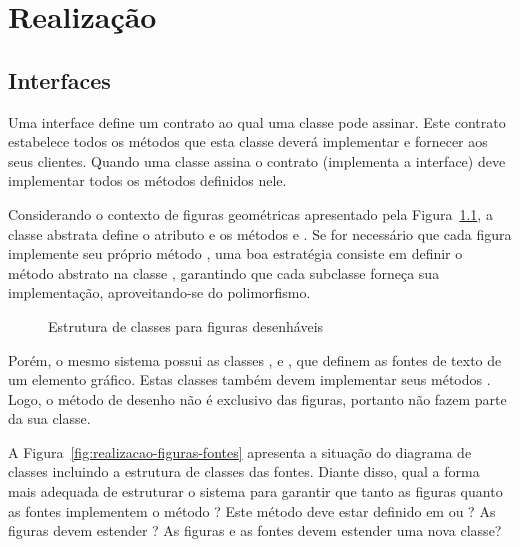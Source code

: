 \chapter{Realização}

\section{Interfaces}

Uma interface define um contrato ao qual uma classe pode assinar. Este contrato estabelece todos os métodos que esta classe deverá implementar e fornecer aos seus clientes. Quando uma classe assina o contrato (implementa a interface) deve implementar todos os métodos definidos nele.

Considerando o contexto de figuras geométricas apresentado pela Figura~\ref{fig:realizacao-figuras}, a classe abstrata  define o atributo  e os métodos  e . Se for necessário que cada figura implemente seu próprio método , uma boa estratégia consiste em definir o método abstrato  na classe , garantindo que cada subclasse forneça sua implementação, aproveitando-se do polimorfismo.

\begin{figure}[h]
	\centering
	
	
	\caption{Estrutura de classes para figuras desenháveis}
	\label{fig:realizacao-figuras}
\end{figure}

Porém, o mesmo sistema possui as classes ,  e , que definem as fontes de texto de um elemento gráfico. Estas classes também devem implementar seus métodos . Logo, o método de desenho não é exclusivo das figuras, portanto não fazem parte da sua classe.

A Figura~\ref{fig:realizacao-figuras-fontes} apresenta a situação do diagrama de classes incluindo a estrutura de classes das fontes. Diante disso, qual a forma mais adequada de estruturar o sistema para garantir que tanto as figuras quanto as fontes implementem o método ? Este método deve estar definido em  ou ? As figuras devem estender ? As figuras e as fontes devem estender uma nova classe?

